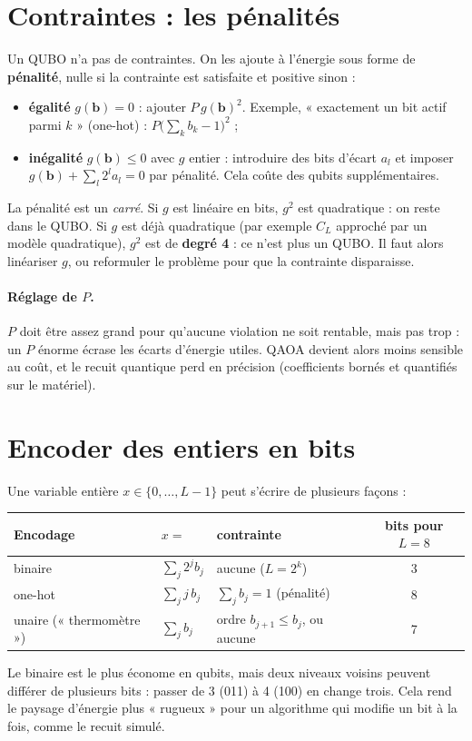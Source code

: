 \section{Contraintes : les pénalités}\label{sec:penalites}
Un QUBO n'a pas de contraintes. On les ajoute à l'énergie sous forme de \textbf{pénalité}, nulle si la contrainte est satisfaite et positive sinon :
\begin{itemize}
\item \textbf{égalité} $g(\mathbf b)=0$ : ajouter $P\,g(\mathbf b)^2$. Exemple, « exactement un bit actif parmi $k$ » (one-hot) : $P\big(\sum_kb_k-1\big)^2$ ;
\item \textbf{inégalité} $g(\mathbf b)\le0$ avec $g$ entier : introduire des bits d'écart $a_l$ et imposer $g(\mathbf b)+\sum_l2^la_l=0$ par pénalité. Cela coûte des qubits supplémentaires.
\end{itemize}
\begin{piege}[ (degré)]
La pénalité est un \emph{carré}. Si $g$ est linéaire en bits, $g^2$ est quadratique : on reste dans le QUBO. Si $g$ est déjà quadratique (par exemple $C_L$ approché par un modèle quadratique), $g^2$ est de \textbf{degré 4} : ce n'est plus un QUBO. Il faut alors linéariser $g$, ou reformuler le problème pour que la contrainte disparaisse.
\end{piege}
\paragraph{Réglage de $P$.} $P$ doit être assez grand pour qu'aucune violation ne soit rentable, mais pas trop : un $P$ énorme écrase les écarts d'énergie utiles. QAOA devient alors moins sensible au coût, et le recuit quantique perd en précision (coefficients bornés et quantifiés sur le matériel).

\section{Encoder des entiers en bits}\label{sec:encodage}
Une variable entière $x\in\{0,\dots,L-1\}$ peut s'écrire de plusieurs façons :
\begin{center}
\begin{tabular}{lll c}
\toprule
Encodage & $x=$ & contrainte & bits pour $L=8$\\
\midrule
binaire & $\sum_{j}2^jb_j$ & aucune ($L=2^k$) & 3\\
one-hot & $\sum_jj\,b_j$ & $\sum_jb_j=1$ (pénalité) & 8\\
unaire (« thermomètre ») & $\sum_jb_j$ & ordre $b_{j+1}\le b_j$, ou aucune & 7\\
\bottomrule
\end{tabular}
\end{center}
Le binaire est le plus économe en qubits, mais deux niveaux voisins peuvent différer de plusieurs bits : passer de 3 (011) à 4 (100) en change trois. Cela rend le paysage d'énergie plus « rugueux » pour un algorithme qui modifie un bit à la fois, comme le recuit simulé.

